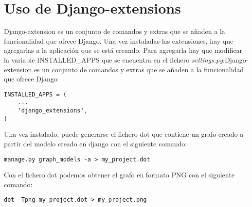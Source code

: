 \section{Uso de Django-extensions}
Django-extension es un conjunto de comandos y extras que se añaden a la funcionalidad que ofrece Django. Una vez instaladas las extensiones, hay que agregarlas a la aplicación que se está creando. Para agregarla hay que modificar la variable INSTALLED\_APPS que se encuentra en el fichero \textit{settings.py}:Django-extension es un conjunto de comandos y extras que se añaden a la funcionalidad que ofrece Django

\begin{lstlisting}
INSTALLED_APPS = (
    ...
    'django_extensions',
)
\end{lstlisting}

Una vez instalado, puede generarse el fichero dot que contiene un grafo creado a partir del modelo creado en django con el siguiente comando:

\begin{lstlisting}
manage.py graph_models -a > my_project.dot
\end{lstlisting}

Con el fichero dot podemos obtener el grafo en formato PNG con el siguiente comando:

\begin{lstlisting}
dot -Tpng my_project.dot > my_project.png
\end{lstlisting}